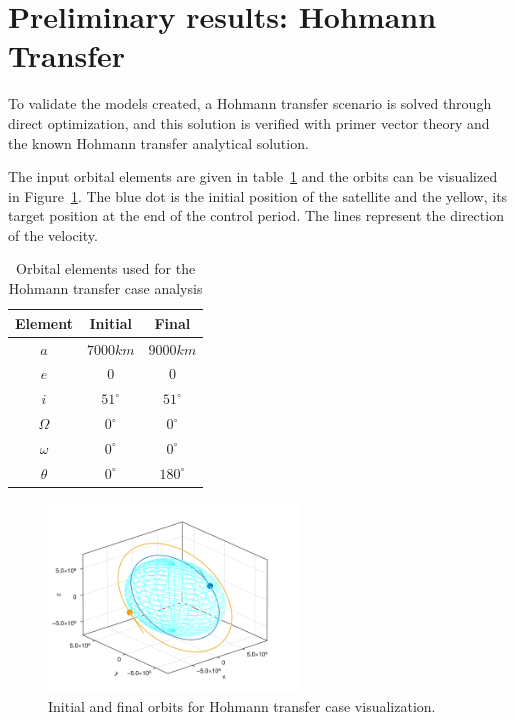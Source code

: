 \section{Preliminary results: Hohmann Transfer}

To validate the models created, a Hohmann transfer scenario is solved through direct optimization, and this solution is verified with primer vector theory and the known Hohmann transfer analytical solution.

The input orbital elements are given in table~\ref{tab:hohmann_orb_elems} and the orbits can be visualized in Figure~\ref{fig:hohmann_condition}. The blue dot is the initial position of the satellite and the yellow, its target position at the end of the control period. The lines represent the direction of the velocity.

\begin{table}[htbp]
    \centering
    \begin{tabular}{ccc} \toprule
        Element & Initial & Final \\ \midrule
        \(a\)      & \(7000km\)   & \(9000km\)   \\
        \(e\)      & \(0\)        & \(0\)        \\
        \(i\)      & \(51^\circ\) & \(51^\circ\) \\
        \(\Omega\) & \(0^\circ\)  & \(0^\circ\)  \\
        \(\omega\) & \(0^\circ\)  & \(0^\circ\)  \\
        \(\theta\) & \(0^\circ\)  & \(180^\circ\)  \\ \bottomrule
    \end{tabular}
    \caption{Orbital elements used for the Hohmann transfer case analysis}
    \label{tab:hohmann_orb_elems}
\end{table}

\begin{figure}[htbp]
    \centering
    \includegraphics[width=0.6\textwidth]{img/hohmann_condition.png}
    \caption{Initial and final orbits for Hohmann transfer case visualization.}
    \label{fig:hohmann_condition}
\end{figure}

